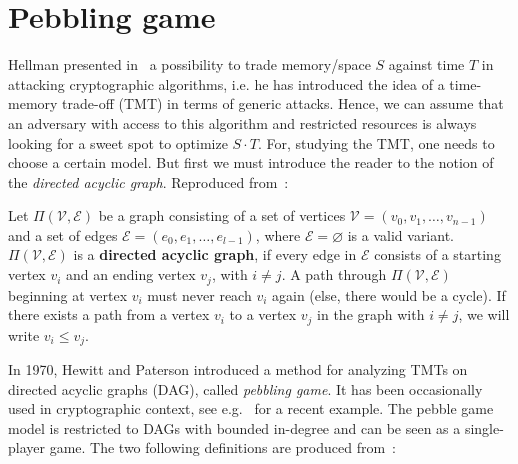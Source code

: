 \section{Pebbling game}
Hellman presented in~\cite{Hellman:2006:CTT:2263346.2269686} a possibility to trade memory/space $S$ against time $T$ in attacking cryptographic algorithms, i.e. he has introduced the idea of a time-memory trade-off (TMT) in terms of generic attacks. Hence, we can assume that an adversary with access to this algorithm and restricted resources is always looking for a sweet spot to optimize $S \cdot T$. For, studying the TMT, one needs to choose a certain model. But first we must introduce the reader to the notion of the \textit{directed acyclic graph}. Reproduced from~\cite{ForlerLW13}:

\begin{definition}
  Let $\Pi(\mathcal{V},\mathcal{E})$ be a graph consisting of a set of vertices $\mathcal{V}=(v_0,v_1,\dots,v_{n-1})$ and a set of edges $\mathcal{E}=(e_0,e_1,\dots,e_{l-1})$, where $\mathcal{E}=\varnothing$ is a valid variant. $\Pi(\mathcal{V},\mathcal{E})$ is a \textbf{directed acyclic graph}, if every edge in $\mathcal{E}$
  consists of a starting vertex $v_i$ and an ending vertex $v_j$, with $i \neq j$. A path through $\Pi(\mathcal{V},\mathcal{E})$ beginning at vertex $v_i$ must never reach $v_i$ again (else, there would be a cycle). If there exists a path from a vertex $v_i$ to a vertex $v_j$ in the graph with $i \neq j$, we will write $v_i \leq v_j$.
\end{definition}

In 1970, Hewitt and Paterson introduced a method for analyzing TMTs on directed acyclic graphs (DAG), called \textit{pebbling game}. It has been occasionally used in cryptographic context, see e.g.~\cite{Dziembowski:2011:KSR:2033036.2033061} for a recent example. The pebble game model is restricted to DAGs with bounded in-degree and can be seen as a single-player game. The two following definitions are produced from~\cite{cryptoeprint:2016:875}:

